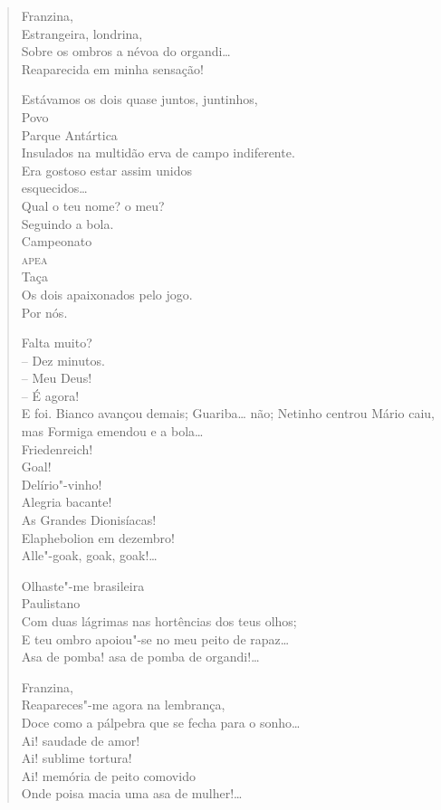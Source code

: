\begin{verse}
Franzina,\\
Estrangeira, londrina,\\
Sobre os ombros a névoa do organdi\ldots{}\\
Reaparecida em minha sensação!

Estávamos os dois quase juntos, juntinhos,\\
\qquad\quad Povo\\
\qquad\quad Parque Antártica\\
Insulados na multidão erva de campo indiferente.\\
Era gostoso estar assim unidos\\
\qquad\qquad\qquad\qquad\qquad\qquad esquecidos\ldots{}\\
Qual o teu nome? o meu?\\
Seguindo a bola.\\
\qquad\qquad\qquad Campeonato\\
\qquad\qquad\quad\textsc{apea}\\
\qquad\qquad Taça\\
Os dois apaixonados pelo jogo.\\
\qquad\qquad\qquad\qquad\qquad Por nós.

Falta muito?\\
-- Dez minutos.\\
-- Meu Deus!\\
-- É agora!\\
E foi. Bianco avançou demais; Guariba\ldots{} não; Netinho centrou Mário caiu, mas Formiga emendou e a bola\ldots{}\\
\quad\quad\quad\quad\quad\quad{}Friedenreich!\\
\quad\quad\quad\quad\quad{}Goal!\\
\quad\quad\quad\quad{}Delírio"-vinho!\\
\quad\quad\quad{}Alegria bacante!\\
\quad\quad{}As Grandes Dionisíacas!\\
\quad{}Elaphebolion em dezembro!\\
Alle"-goak, goak, goak!\ldots{}

Olhaste"-me brasileira\\
\quad\quad\quad\quad{}Paulistano\\
Com duas lágrimas nas hortências dos teus olhos;\\
E teu ombro apoiou"-se no meu peito de rapaz\ldots{}\\
Asa de pomba! asa de pomba de organdi!\ldots{}

Franzina,\\
Reapareces"-me agora na lembrança,\\
Doce como a pálpebra que se fecha para o sonho\ldots{}\\
Ai! saudade de amor!\\
Ai! sublime tortura!\\
Ai! memória de peito comovido\\
Onde poisa macia uma asa de mulher!\ldots{}
\end{verse}

